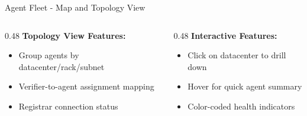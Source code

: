 \begin{frame}{Agent Fleet - Map and Topology View}
\begin{center}
  \end{center}

  \vspace{0.1cm}

  \begin{columns}[T]
    \begin{column}{0.48\textwidth}
      \scriptsize
      \textbf{Topology View Features:}
      \begin{itemize}
        \item Group agents by datacenter/rack/subnet
        \item Verifier-to-agent assignment mapping
        \item Registrar connection status
      \end{itemize}
    \end{column}
    \begin{column}{0.48\textwidth}
      \scriptsize
      \textbf{Interactive Features:}
      \begin{itemize}
        \item Click on datacenter to drill down
        \item Hover for quick agent summary
        \item Color-coded health indicators
      \end{itemize}
    \end{column}
  \end{columns}
\end{frame}
